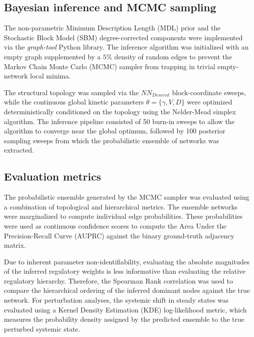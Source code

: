 \documentclass[10pt, aps, rmp,  twocolumn, superscriptaddress, floatfix, showkeys]{revtex4-2}
\begin{document}
\subsection{Bayesian inference and MCMC sampling}
The non-parametric Minimum Description Length (MDL) prior and the Stochastic Block Model (SBM) degree-corrected components were implemented via the \textit{graph-tool} Python library. The inference algorithm was initialized with an empty graph supplemented by a $5\%$ density of random edges to prevent the Markov Chain Monte Carlo (MCMC) sampler from trapping in trivial empty-network local minima.

The structural topology was sampled via the $NN_{Descent}$ block-coordinate sweeps, while the continuous global kinetic parameters $\theta = \{\gamma, V, D\}$ were optimized deterministically conditioned on the topology using the Nelder-Mead simplex algorithm. The inference pipeline consisted of 50 burn-in sweeps to allow the algorithm to converge near the global optimum, followed by 100 posterior sampling sweeps from which the probabilistic ensemble of networks was extracted.

\subsection{Evaluation metrics}
The probabilistic ensemble generated by the MCMC sampler was evaluated using a combination of topological and hierarchical metrics. The ensemble networks were marginalized to compute individual edge probabilities. These probabilities were used as continuous confidence scores to compute the Area Under the Precision-Recall Curve (AUPRC) against the binary ground-truth adjacency matrix. 

Due to inherent parameter non-identifiability, evaluating the absolute magnitudes of the inferred regulatory weights is less informative than evaluating the relative regulatory hierarchy. Therefore, the Spearman Rank correlation was used to compare the hierarchical ordering of the inferred dominant nodes against the true network. For perturbation analyses, the systemic shift in steady states was evaluated using a Kernel Density Estimation (KDE) log-likelihood metric, which measures the probability density assigned by the predicted ensemble to the true perturbed systemic state.
\end{document}
